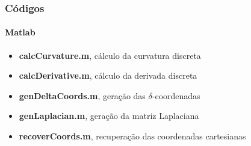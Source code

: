 \begin{frame}
\frametitle{Códigos}
\framesubtitle{Matlab}

\begin{itemize}
\item \textbf{calcCurvature.m}, cálculo da curvatura discreta
\item \textbf{calcDerivative.m}, cálculo da derivada discreta
\item \textbf{genDeltaCoords.m}, geração das $\delta$-coordenadas
\item \textbf{genLaplacian.m}, geração da matriz Laplaciana
\item \textbf{recoverCoords.m}, recuperação das coordenadas cartesianas
\end{itemize}

\end{frame}